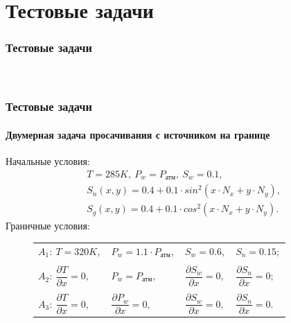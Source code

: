 \section{Тестовые задачи}

\begin{frame}
\begin{center}
\frametitle{Тестовые задачи}
\framesubtitle{\ }
\end{center}
\end{frame}

\begin{frame}
\frametitle{Тестовые задачи}
\framesubtitle{Двумерная задача просачивания с источником на границе}
\begin{center}
Начальные условия: 
\begin{equation*}
  \begin{aligned}
    &T=285K,\ P_w=P_\text{атм},\ S_w=0.1,\\
    &S_n(x, y)=0.4 + 0.1 \cdot sin^2(x \cdot N_x + y \cdot N_y),\\
    &S_g(x, y)=0.4 + 0.1 \cdot cos^2(x \cdot N_x + y \cdot N_y).
   \end{aligned}
\end{equation*}
Граничные условия:
\begin{figure}
\begin{minipage}[h]{0.24\textwidth}
\end{minipage}
\hfill
\begin{minipage}[h]{0.75\textwidth}
  \begin{tabular}{ l l l l }
    $A_1:\ T=320K,$ & $P_w=1.1\cdot P_{\text{атм}},$ & $S_w=0.6,$ & $S_n=0.15;$\\
      & & & \\
    $A_2:\ \dfrac{\partial{T}}{\partial{x}}=0,$ & ${P_w}=P_{\text{атм}},$ & $\dfrac{\partial{S_w}}{\partial{x}}=0,$ & $\dfrac{\partial{S_n}}{\partial{x}}=0;$\\
      & & & \\
    $A_3:\ \dfrac{\partial{T}}{\partial{x}}=0,$ & $\dfrac{\partial{P_w}}{\partial{x}}=0,$ & $\dfrac{\partial{S_w}}{\partial{x}}=0,$ & $\dfrac{\partial{S_n}}{\partial{x}}=0.$
  \end{tabular}
\end{minipage}
\end{figure}
\end{center}
\end{frame}


